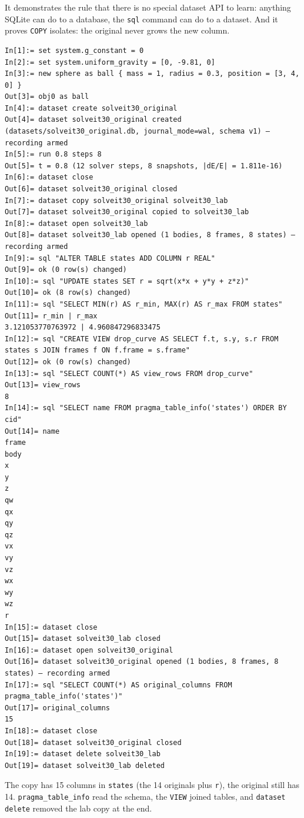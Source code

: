 \documentclass[11pt]{article}
\newcommand{\kw}[1]{\texttt{\uppercase{#1}}}
\newcommand{\code}[1]{\texttt{#1}}
\begin{document}
It demonstrates the rule that there is no special dataset API to
learn: anything SQLite can do to a database, the \code{sql} command
can do to a dataset. And it proves \kw{copy} isolates: the original
never grows the new column.

\begin{lstlisting}
In[1]:= set system.g_constant = 0
In[2]:= set system.uniform_gravity = [0, -9.81, 0]
In[3]:= new sphere as ball { mass = 1, radius = 0.3, position = [3, 4, 0] }
Out[3]= obj0 as ball
In[4]:= dataset create solveit30_original
Out[4]= dataset solveit30_original created (datasets/solveit30_original.db, journal_mode=wal, schema v1) — recording armed
In[5]:= run 0.8 steps 8
Out[5]= t = 0.8 (12 solver steps, 8 snapshots, |dE/E| = 1.811e-16)
In[6]:= dataset close
Out[6]= dataset solveit30_original closed
In[7]:= dataset copy solveit30_original solveit30_lab
Out[7]= dataset solveit30_original copied to solveit30_lab
In[8]:= dataset open solveit30_lab
Out[8]= dataset solveit30_lab opened (1 bodies, 8 frames, 8 states) — recording armed
In[9]:= sql "ALTER TABLE states ADD COLUMN r REAL"
Out[9]= ok (0 row(s) changed)
In[10]:= sql "UPDATE states SET r = sqrt(x*x + y*y + z*z)"
Out[10]= ok (8 row(s) changed)
In[11]:= sql "SELECT MIN(r) AS r_min, MAX(r) AS r_max FROM states"
Out[11]= r_min | r_max
3.121053770763972 | 4.960847296833475
In[12]:= sql "CREATE VIEW drop_curve AS SELECT f.t, s.y, s.r FROM states s JOIN frames f ON f.frame = s.frame"
Out[12]= ok (0 row(s) changed)
In[13]:= sql "SELECT COUNT(*) AS view_rows FROM drop_curve"
Out[13]= view_rows
8
In[14]:= sql "SELECT name FROM pragma_table_info('states') ORDER BY cid"
Out[14]= name
frame
body
x
y
z
qw
qx
qy
qz
vx
vy
vz
wx
wy
wz
r
In[15]:= dataset close
Out[15]= dataset solveit30_lab closed
In[16]:= dataset open solveit30_original
Out[16]= dataset solveit30_original opened (1 bodies, 8 frames, 8 states) — recording armed
In[17]:= sql "SELECT COUNT(*) AS original_columns FROM pragma_table_info('states')"
Out[17]= original_columns
15
In[18]:= dataset close
Out[18]= dataset solveit30_original closed
In[19]:= dataset delete solveit30_lab
Out[19]= dataset solveit30_lab deleted
\end{lstlisting}

\begin{sloppypar}
The copy has 15 columns in \code{states} (the 14 originals plus
\code{r}), the original still has 14. \code{pragma\_table\_info} read
the schema, the \code{VIEW} joined tables, and \code{dataset delete}
removed the lab copy at the end.
\end{sloppypar}
\end{document}
